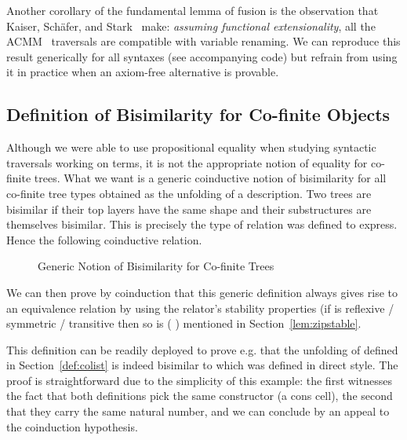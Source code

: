 {Another corollary of the fundamental lemma of fusion is the observation that
Kaiser, Schäfer, and Stark~\citeyear{Kaiser-wsdebr} make: \emph{assuming
functional extensionality}, all the ACMM~\citeyear{allais2017type} traversals
are compatible with variable renaming. We can reproduce this result generically
for all syntaxes (see accompanying code) but refrain from using it in practice
when an axiom-free alternative is provable.



\subsection{Definition of Bisimilarity for Co-finite Objects}

Although we were able to use propositional equality when studying
syntactic traversals working on terms, it is not the appropriate
notion of equality for co-finite trees. What we want is a generic
coinductive notion of bisimilarity for all co-finite tree types
obtained as the unfolding of a description. Two trees are bisimilar
if their top layers have the same shape and their substructures are
themselves bisimilar. This is precisely the type of relation 
was defined to express. Hence the following coinductive relation.

\begin{figure}[h]
\caption{Generic Notion of Bisimilarity for Co-finite Trees}
\end{figure}

We can then prove by coinduction that this generic definition always gives
rise to an equivalence relation by using the relator's stability properties
(if  is reflexive / symmetric / transitive then so is {(   )}
mentioned in Section~\ref{lem:zipstable}.

\begin{center}
\end{center}

This definition can be readily deployed to prove e.g. that the unfolding
of  defined in Section~\ref{def:colist} is indeed bisimilar to 
which was defined in direct style. The proof is straightforward due to the simplicity
of this example: the first  witnesses the fact that both definitions
pick the same constructor (a cons cell), the second that they carry the
same natural number, and we can conclude by an appeal to the coinduction
hypothesis.

}
